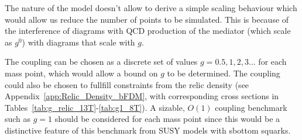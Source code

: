 The nature of the model doesn't allow to derive a simple scaling behaviour which would allow us reduce the number of points to be simulated. This is because of the interference of diagrams with QCD production of the mediator (which scale as $g^0$) with diagrams that scale with $g$.~

The coupling can be chosen as a discrete set of values $g=0.5,1,2,3...$ for each mass point, which would allow a bound on $g$ to be determined.  The coupling could also be chosen to fullfill constraints from the relic density (see Appendix~\ref{app:Relic_Density_bFDM}, with corresponding cross sections in Tables~\ref{tab:g_relic_13T}-\ref{tab:g1_8T}). A sizable, $O(1)$ coupling benchmark such as $g=1$ should be considered for each mass point since this would be a distinctive feature of this benchmark from SUSY models with sbottom squarks.

